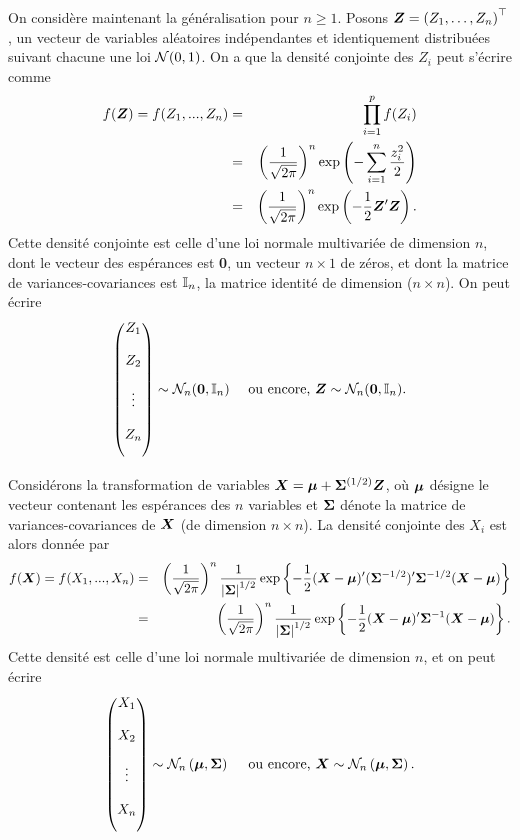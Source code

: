 On considère maintenant la généralisation pour $n\geq 1$.  Posons $\bm{Z}=\left( Z_1, \dots, Z_n \right)^\top$, un vecteur de variables aléatoires indépendantes et identiquement distribuées suivant chacune une loi  $\mathcal{N}(0,1)$. On a que la densité conjointe des $Z_i$ peut  s'écrire comme
\begin{eqnarray}
f(\bm{Z}) = f(Z_1, ..., Z_n) &=& \prod_{i=1}^p f(Z_i) \nonumber\\
&=&  \left(\frac{1}{\sqrt{2\pi}}\right)^n \exp\left(-\sum_{i=1}^n \frac{z_i^2}{2}\right)\nonumber\\
 &=& \left(\frac{1}{\sqrt{2\pi}}\right)^n \exp\left(-\frac{1}{2} \bm{Z}'\bm{Z}\right).
\end{eqnarray}
Cette densité conjointe est celle d'une loi normale multivariée de dimension $n$, dont le vecteur des espérances est \textbf{0}, un vecteur $n\times 1$ de zéros, et dont la matrice de variances-covariances est $\mathbb{I}_n$, la matrice identité de dimension ($n \times n$). On peut écrire
\begin{eqnarray*}
\begin{pmatrix}
Z_1 \\[4mm]
Z_2 \\[4mm]
\vdots \\[4mm]
Z_n \\[4mm]    
\end{pmatrix}
\sim \mathcal{N}_n (\textbf{0}, \bm{\mathbb{I}}_n) \quad\text{ ou encore, }\bm{Z}\sim \mathcal{N}_n (\textbf{0}, \bm{\mathbb{I}}_n).
\end{eqnarray*}

Considérons la transformation de variables $\bm{X}=\bm{\mu} + \bm{\Sigma}^{(1/2)}\bm{Z}$, où $\bm{\mu}$ désigne le vecteur contenant les espérances des $n$ variables et $\bm{\Sigma}$ dénote la matrice de variances-covariances de $\bm{X}$ (de dimension $n \times n$). La densité conjointe des $X_i$ est alors donnée par
\begin{eqnarray}
f(\bm{X}) = f(X_1, ..., X_n) 
  &=& \left(\frac{1}{\sqrt{2\pi}}\right)^n \frac{1}{\left|\bm{\Sigma}\right|^{1/2}} \exp\left\{-\frac{1}{2} (\bm{X}- \bm{\mu})' (\bm{\Sigma}^{-1/2})' \bm{\Sigma}^{-1/2} (\bm{X}- \bm{\mu})\right\}\nonumber\\
 &=& \left(\frac{1}{\sqrt{2\pi}}\right)^n \frac{1}{\left|\bm{\Sigma}\right|^{1/2}} \exp\left\{-\frac{1}{2} (\bm{X}- \bm{\mu})' \bm{\Sigma}^{-1} (\bm{X}- \bm{\mu})\right\}.
\label{normalemulti}
\end{eqnarray}
Cette densité est celle d'une loi normale multivariée de dimension $n$, et on peut écrire
\begin{eqnarray*}
\begin{pmatrix}
X_1 \\[4mm]
X_2 \\[4mm]
\vdots \\[4mm]
X_n \\[4mm]    
\end{pmatrix} \sim \mathcal{N}_n \left(\bm{\mu}, \bm{\Sigma}\right) \quad\text{ ou encore, }\bm{X}\sim \mathcal{N}_n \left(\bm{\mu}, \bm{\Sigma}\right) .
\end{eqnarray*}


